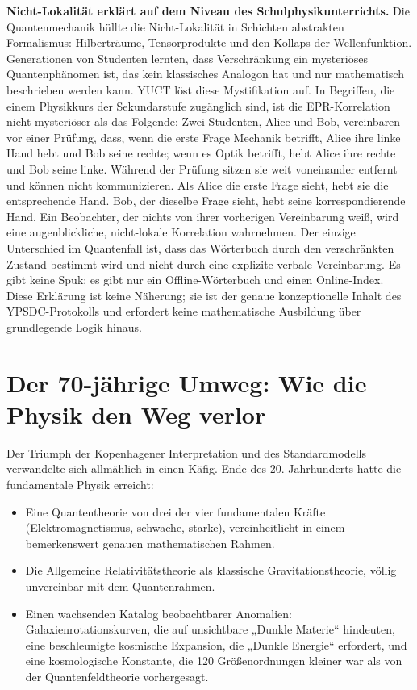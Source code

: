 \documentclass[12pt,a4paper]{article}
\begin{document}
	\textbf{Nicht-Lokalität erklärt auf dem Niveau des Schulphysikunterrichts.} Die Quantenmechanik hüllte die Nicht-Lokalität in Schichten abstrakten Formalismus: Hilberträume, Tensorprodukte und den Kollaps der Wellenfunktion. Generationen von Studenten lernten, dass Verschränkung ein mysteriöses Quantenphänomen ist, das kein klassisches Analogon hat und nur mathematisch beschrieben werden kann. YUCT löst diese Mystifikation auf. In Begriffen, die einem Physikkurs der Sekundarstufe zugänglich sind, ist die EPR-Korrelation nicht mysteriöser als das Folgende: Zwei Studenten, Alice und Bob, vereinbaren vor einer Prüfung, dass, wenn die erste Frage Mechanik betrifft, Alice ihre linke Hand hebt und Bob seine rechte; wenn es Optik betrifft, hebt Alice ihre rechte und Bob seine linke. Während der Prüfung sitzen sie weit voneinander entfernt und können nicht kommunizieren. Als Alice die erste Frage sieht, hebt sie die entsprechende Hand. Bob, der dieselbe Frage sieht, hebt seine korrespondierende Hand. Ein Beobachter, der nichts von ihrer vorherigen Vereinbarung weiß, wird eine augenblickliche, nicht-lokale Korrelation wahrnehmen. Der einzige Unterschied im Quantenfall ist, dass das Wörterbuch durch den verschränkten Zustand bestimmt wird und nicht durch eine explizite verbale Vereinbarung. Es gibt keine Spuk; es gibt nur ein Offline-Wörterbuch und einen Online-Index. Diese Erklärung ist keine Näherung; sie ist der genaue konzeptionelle Inhalt des YPSDC-Protokolls und erfordert keine mathematische Ausbildung über grundlegende Logik hinaus.
	
	\section{Der 70-jährige Umweg: Wie die Physik den Weg verlor}
	
	Der Triumph der Kopenhagener Interpretation und des Standardmodells verwandelte sich allmählich in einen Käfig. Ende des 20. Jahrhunderts hatte die fundamentale Physik erreicht:
	\begin{itemize}
		\item Eine Quantentheorie von drei der vier fundamentalen Kräfte (Elektromagnetismus, schwache, starke), vereinheitlicht in einem bemerkenswert genauen mathematischen Rahmen.
		\item Die Allgemeine Relativitätstheorie als klassische Gravitationstheorie, völlig unvereinbar mit dem Quantenrahmen.
		\item Einen wachsenden Katalog beobachtbarer Anomalien: Galaxienrotationskurven, die auf unsichtbare „Dunkle Materie“ hindeuten, eine beschleunigte kosmische Expansion, die „Dunkle Energie“ erfordert, und eine kosmologische Konstante, die 120 Größenordnungen kleiner war als von der Quantenfeldtheorie vorhergesagt.
	\end{itemize}
	
\end{document}
